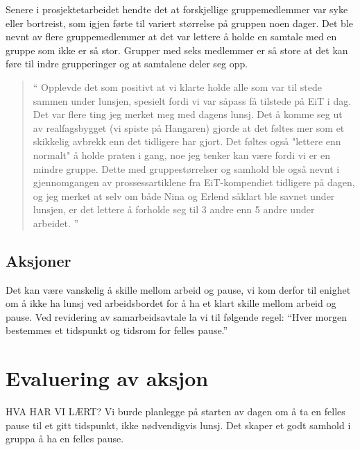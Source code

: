 Senere i prosjektetarbeidet hendte det at forskjellige gruppemedlemmer var syke eller bortreist, som igjen førte til variert størrelse på gruppen noen dager.  Det ble nevnt av flere gruppemedlemmer at det var lettere å holde en samtale med en gruppe som ikke er så stor. Grupper med seks medlemmer er så store at det kan føre til indre grupperinger og at samtalene deler seg opp.

\begin{quote}``
Opplevde det som positivt at vi klarte holde alle som var til stede sammen under lunsjen, spesielt fordi vi var såpass få tilstede på EiT i dag. Det var flere ting jeg merket meg med dagens lunsj. Det å komme seg ut av realfagsbygget (vi spiste på Hangaren) gjorde at det føltes mer som et skikkelig avbrekk enn det tidligere har gjort. Det føltes også "lettere enn normalt" å holde praten i gang, noe jeg tenker kan være fordi vi er en mindre gruppe. Dette med gruppestørrelser og samhold ble også nevnt i gjennomgangen av prossessartiklene fra EiT-kompendiet tidligere på dagen, og jeg merket at selv om både Nina og Erlend såklart ble savnet under lunsjen, er det lettere å forholde seg til 3 andre enn 5 andre under arbeidet.
''\end{quote} 


\subsection*{Aksjoner}
Det kan være vanskelig å skille mellom arbeid og pause, vi kom derfor til enighet om å ikke ha lunsj ved arbeidsbordet for å ha et klart skille mellom arbeid og pause. 
Ved revidering av samarbeidsavtale la vi til følgende regel:  ``Hver morgen bestemmes et tidspunkt og tidsrom for felles pause.''

\section{Evaluering av aksjon} 
HVA HAR VI LÆRT?
Vi burde planlegge på starten av dagen om å ta en felles pause til et gitt tidspunkt, ikke nødvendigvis lunsj. Det skaper et godt samhold i gruppa å ha en felles pause.
